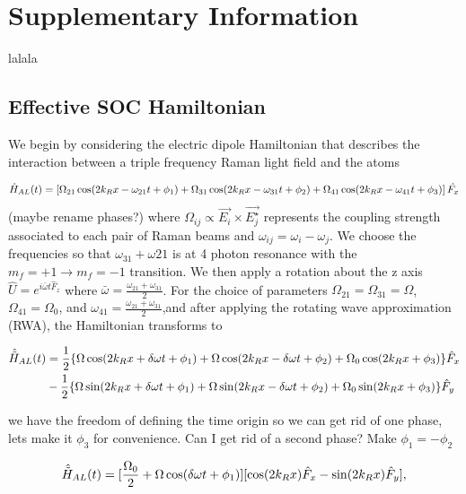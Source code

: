 \section{Supplementary Information}
lalala

\subsection{Effective SOC Hamiltonian}	

We begin by considering the electric dipole Hamiltonian that describes the interaction between a triple frequency Raman light field and the atoms

\begin{align}
	\hat{H}_{AL}(t) = \left[\Omega_{21}\cos(2{{k_R}} x-\omega_{21} t +\phi_1)+\Omega_{31}\cos(2{{k_R}} x-\omega_{31} t+\phi_2)+\Omega_{41}\cos(2{{k_R}} x-\omega_{41} t + \phi_3)\right]\hat{F_x}
\end{align}
%
(maybe rename phases?)
%
where $\Omega_{ij}\propto \vec{E_i}\times\vec{E_j^{\star}}$ represents the coupling strength associated to each pair of Raman beams and $\omega_{ij} = \omega_{i}-\omega_{j} $. We choose the frequencies so that $\omega_{31} + \omega{21}$ is at 4 photon resonance with the $m_f = +1\rightarrow m_f = -1$ transition. We then apply a rotation about the z axis $\hat{U} = e^{i\bar{\omega} t\hat{F}_z}$ where $\bar{\omega} = \frac{\omega_{21}+\omega_{31}}{2}$. For the choice of parameters 
$\Omega_{21} =\Omega_{31} = \Omega $, $\Omega_{41}=\Omega_0$, and $\omega_{41} =\frac{\omega_{21}+\omega_{31}}{2}$,and after applying the rotating wave approximation (RWA), the Hamiltonian transforms to  
%
%

	
\begin{align}
	\begin{split}
		\hat{\tilde{H}}_{AL}(t) &= \frac{1}{2}\lbrace\Omega\cos(2{{k_R}} x+\delta\omega t +\phi_1)+\Omega\cos(2{{k_R}} x-\delta\omega t + \phi_2) +\Omega_0\cos(2{{k_R}} x + \phi_3)\rbrace \hat{F}_x \\
		& -  \frac{1}{2}\lbrace\Omega\sin(2{{k_R}} x+\delta\omega t +\phi_1)+\Omega\sin(2{{k_R}} x-\delta\omega t +\phi_2)+\Omega_0\sin(2{{k_R}} x +\phi_3)\rbrace \hat{F}_y
	\end{split}
\end{align}

we have the freedom of defining the time origin so we can get rid of one phase, lets make it $\phi_3$ for convenience. Can I get rid of a second phase? Make $\phi_1 = -\phi_2$
 
\begin{align}
 	\begin{split}
 		\hat{\tilde{H}}_{AL}(t)  = [\frac{\Omega_0}{2} + \Omega\cos(\delta\omega t+\phi_1)][\cos(2{{k_R}} x)\hat{F}_x - \sin(2{{k_R}} x)\hat{F}_y],
 	\end{split}
\end{align}


